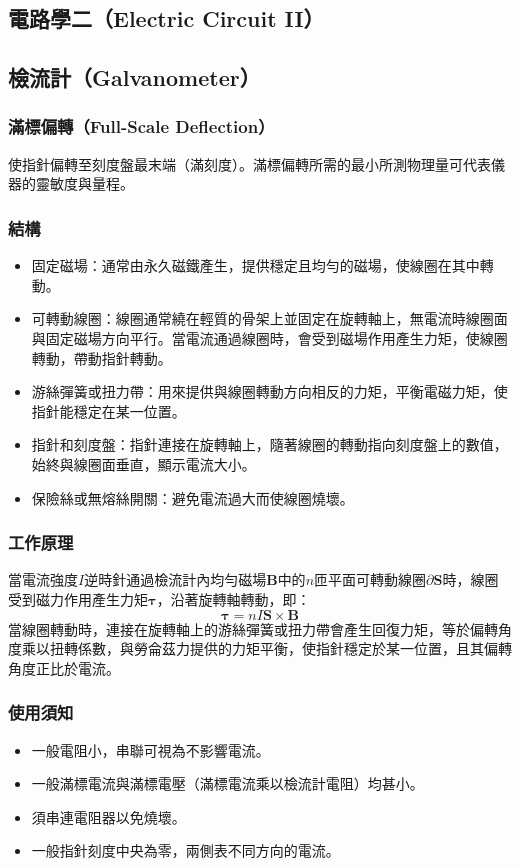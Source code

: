 \documentclass[a4paper,12pt]{report}
\begin{document}
\begin{itemize}
\section{電路學二（Electric Circuit II）}
\subsection{檢流計（Galvanometer）}
\subsubsection{滿標偏轉（Full-Scale Deflection）}
使指針偏轉至刻度盤最末端（滿刻度）。滿標偏轉所需的最小所測物理量可代表儀器的靈敏度與量程。
\subsubsection{結構}
\begin{itemize}
\item 固定磁場：通常由永久磁鐵產生，提供穩定且均勻的磁場，使線圈在其中轉動。
\item 可轉動線圈：線圈通常繞在輕質的骨架上並固定在旋轉軸上，無電流時線圈面與固定磁場方向平行。當電流通過線圈時，會受到磁場作用產生力矩，使線圈轉動，帶動指針轉動。
\item 游絲彈簧或扭力帶：用來提供與線圈轉動方向相反的力矩，平衡電磁力矩，使指針能穩定在某一位置。
\item 指針和刻度盤：指針連接在旋轉軸上，隨著線圈的轉動指向刻度盤上的數值，始終與線圈面垂直，顯示電流大小。
\item 保險絲或無熔絲開關：避免電流過大而使線圈燒壞。
\end{itemize}
\subsubsection{工作原理}
當電流強度$I$逆時針通過檢流計內均勻磁場$\mathbf{B}$中的$n$匝平面可轉動線圈$\partial\mathbf{S}$時，線圈受到磁力作用產生力矩$\boldsymbol{\tau}$，沿著旋轉軸轉動，即：
\[\boldsymbol{\tau} = nI\mathbf{S}\times\mathbf{B}\]
當線圈轉動時，連接在旋轉軸上的游絲彈簧或扭力帶會產生回復力矩，等於偏轉角度乘以扭轉係數，與勞侖茲力提供的力矩平衡，使指針穩定於某一位置，且其偏轉角度正比於電流。
\subsubsection{使用須知}
\begin{itemize}
\item 一般電阻小，串聯可視為不影響電流。
\item 一般滿標電流與滿標電壓（滿標電流乘以檢流計電阻）均甚小。
\item 須串連電阻器以免燒壞。
\item 一般指針刻度中央為零，兩側表不同方向的電流。
\end{itemize}

\end{itemize}
\end{document}
